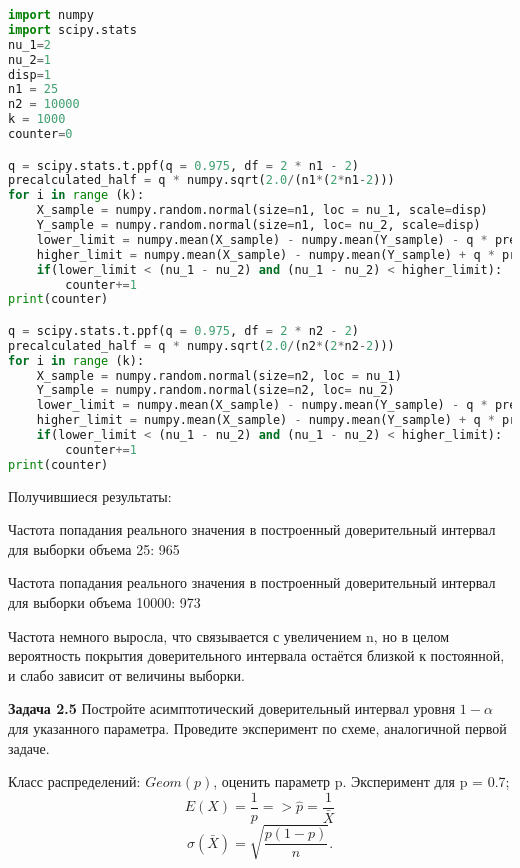 \documentclass{article}
\begin{document}
    \begin{lstlisting}[language=Python, mathescape=true, breaklines=true]
import numpy
import scipy.stats
nu_1=2
nu_2=1
disp=1
n1 = 25
n2 = 10000
k = 1000
counter=0

q = scipy.stats.t.ppf(q = 0.975, df = 2 * n1 - 2)
precalculated_half = q * numpy.sqrt(2.0/(n1*(2*n1-2)))
for i in range (k):
    X_sample = numpy.random.normal(size=n1, loc = nu_1, scale=disp)
    Y_sample = numpy.random.normal(size=n1, loc= nu_2, scale=disp)
    lower_limit = numpy.mean(X_sample) - numpy.mean(Y_sample) - q * precalculated_half*numpy.sqrt(n1 * (numpy.var(X_sample, ddof=1) + numpy.var(Y_sample, ddof=1)))
    higher_limit = numpy.mean(X_sample) - numpy.mean(Y_sample) + q * precalculated_half*numpy.sqrt(n1 * (numpy.var(X_sample, ddof=1) + numpy.var(Y_sample, ddof=1)))
    if(lower_limit < (nu_1 - nu_2) and (nu_1 - nu_2) < higher_limit):
        counter+=1
print(counter)

q = scipy.stats.t.ppf(q = 0.975, df = 2 * n2 - 2)
precalculated_half = q * numpy.sqrt(2.0/(n2*(2*n2-2)))
for i in range (k):
    X_sample = numpy.random.normal(size=n2, loc = nu_1)
    Y_sample = numpy.random.normal(size=n2, loc= nu_2)
    lower_limit = numpy.mean(X_sample) - numpy.mean(Y_sample) - q * precalculated_half*numpy.sqrt(n2 * (numpy.var(X_sample) + numpy.var(Y_sample)))
    higher_limit = numpy.mean(X_sample) - numpy.mean(Y_sample) + q * precalculated_half*numpy.sqrt(n2 * (numpy.var(X_sample) + numpy.var(Y_sample)))
    if(lower_limit < (nu_1 - nu_2) and (nu_1 - nu_2) < higher_limit):
        counter+=1
print(counter)
    \end{lstlisting}
    Получившиеся результаты:

    Частота попадания реального значения в построенный доверительный интервал для выборки объема 25: 965

    
    Частота попадания реального значения в построенный доверительный интервал для выборки объема 10000: 973

    Частота немного выросла, что связывается с увеличением n, но в целом вероятность покрытия доверительного интервала остаётся близкой к постоянной, и слабо зависит от величины выборки.
    
\textbf{Задача 2.5}
Постройте асимптотический доверительный интервал уровня $ 1-\alpha$ для указанного параметра. Проведите эксперимент по схеме, аналогичной первой задаче.

Класс распределений: $Geom(p)$, оценить параметр p. Эксперимент для p = 0.7;
$$E(X)=\frac{1}{p} => \widehat{p}=\frac{1}{\bar{X}}$$
$$\sigma(\bar{X}) = \sqrt{\frac{p(1-p)}{n}}.$$
\end{document}

